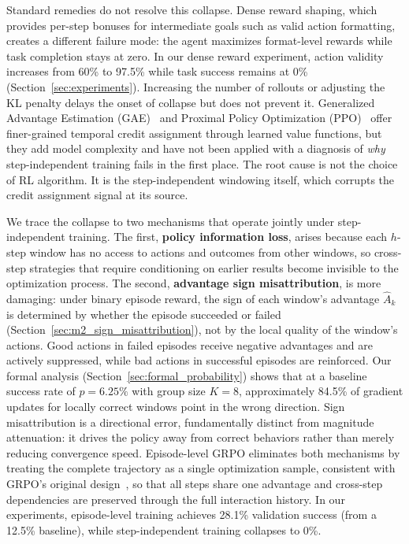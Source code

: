 Standard remedies do not resolve this collapse. Dense reward shaping, which provides per-step bonuses for intermediate goals such as valid action formatting, creates a different failure mode: the agent maximizes format-level rewards while task completion stays at zero. In our dense reward experiment, action validity increases from 60\% to 97.5\% while task success remains at 0\% (Section~\ref{sec:experiments}). Increasing the number of rollouts or adjusting the KL penalty delays the onset of collapse but does not prevent it. Generalized Advantage Estimation (GAE)~\cite{schulman2016gae} and Proximal Policy Optimization (PPO)~\cite{schulman2017ppo} offer finer-grained temporal credit assignment through learned value functions, but they add model complexity and have not been applied with a diagnosis of \textit{why} step-independent training fails in the first place. The root cause is not the choice of RL algorithm. It is the step-independent windowing itself, which corrupts the credit assignment signal at its source.

We trace the collapse to two mechanisms that operate jointly under step-independent training. The first, \textbf{policy information loss}, arises because each $h$-step window has no access to actions and outcomes from other windows, so cross-step strategies that require conditioning on earlier results become invisible to the optimization process. The second, \textbf{advantage sign misattribution}, is more damaging: under binary episode reward, the sign of each window's advantage $\hat{A}_k$ is determined by whether the episode succeeded or failed (Section~\ref{sec:m2_sign_misattribution}), not by the local quality of the window's actions. Good actions in failed episodes receive negative advantages and are actively suppressed, while bad actions in successful episodes are reinforced. Our formal analysis (Section~\ref{sec:formal_probability}) shows that at a baseline success rate of $p = 6.25\%$ with group size $K = 8$, approximately 84.5\% of gradient updates for locally correct windows point in the wrong direction. Sign misattribution is a directional error, fundamentally distinct from magnitude attenuation: it drives the policy away from correct behaviors rather than merely reducing convergence speed. Episode-level GRPO eliminates both mechanisms by treating the complete trajectory as a single optimization sample, consistent with GRPO's original design~\cite{shao2024deepseekmath}, so that all steps share one advantage and cross-step dependencies are preserved through the full interaction history. In our experiments, episode-level training achieves 28.1\% validation success (from a 12.5\% baseline), while step-independent training collapses to 0\%.

